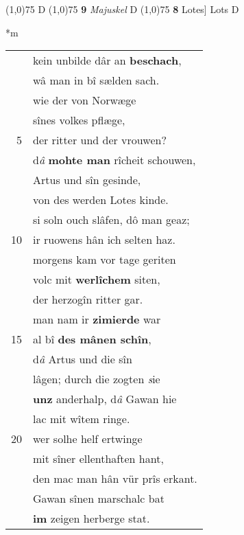 \documentclass[8pt,a4paper,notitlepage]{article}
\begin{document}
\begin{table}[ht]
\begin{minipage}[t]{0.5\linewidth}
\begin{tabular}{rl}
\end{tabular}
\scriptsize
\line(1,0){75} \newline
D \newline
\line(1,0){75} \newline
\textbf{9} \textit{Majuskel} D  \newline
\line(1,0){75} \newline
\textbf{8} Lotes] Lots D \newline
\end{minipage}
\hspace{0.5cm}
\begin{minipage}[t]{0.5\linewidth}
\small
\begin{center}*m
\end{center}
\begin{tabular}{rl}
 & kein unbilde dâr an \textbf{beschach},\\ 
 & wâ man in bî sælden sach.\\ 
 & wie der von Norwæge\\ 
 & sînes volkes pflæge,\\ 
5 & der ritter und der vrouwen?\\ 
 & d\textit{â} \textbf{mohte man} rîcheit schouwen,\\ 
 & Artus und sîn gesinde,\\ 
 & von des werden Lotes kinde.\\ 
 & si soln ouch slâfen, dô man geaz;\\ 
10 & ir ruowens hân ich selten haz.\\ 
 & morgens kam vor tage geriten\\ 
 & volc mit \textbf{werlîchem} siten,\\ 
 & der herzogîn ritter gar.\\ 
 & man nam ir \textbf{zimierde} war\\ 
15 & al bî \textbf{des mânen schîn},\\ 
 & d\textit{â} Artus und die sîn\\ 
 & lâgen; durch die zogten \textit{s}ie\\ 
 & \textbf{unz} anderhalp, d\textit{â} Gawan hie\\ 
 & lac mit wîtem ringe.\\ 
20 & wer solhe helf ertwinge\\ 
 & mit sîner ellenthaften hant,\\ 
 & den mac man hân vür prîs erkant.\\ 
 & Gawan sînen marschalc bat\\ 
 & \textbf{im} zeigen herberge stat.\\ 

\end{tabular}
\end{minipage}
\end{table}
\end{document}
